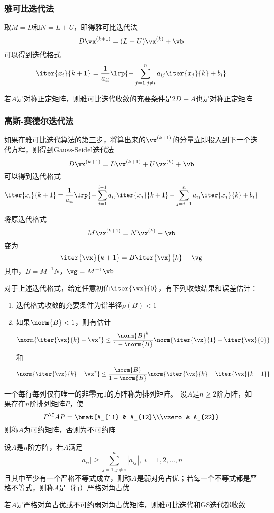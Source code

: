 \subsubsection{雅可比迭代法}
取$M=D$和$N=L+U$，即得雅可比迭代法
\[D\vx^{(k+1)}=(L+U)\vx^{(k)}+\vb\]
可以得到迭代格式
\[\iter{x_i}{k+1}=\frac{1}{a_{ii}}\lrp{-\sum_{j=1,j\ne i}^n a_{ij}\iter{x_j}{k}+b_i}\]

\begin{theorem}
    若$A$是对称正定矩阵，则雅可比迭代收敛的充要条件是$2D-A$也是对称正定矩阵
\end{theorem}

\subsubsection{高斯-赛德尔迭代法}
如果在雅可比迭代算法的第三步，将算出来的$\vx^{(k+1)}$的分量立即投入到下一个迭代方程，则得到Gauss-Seidel迭代法
\[D\vx^{(k+1)}=L\vx^{(k+1)}+U\vx^{(k)}+\vb\]
可以得到迭代格式
\[\iter{x_i}{k+1}=\frac{1}{a_{ii}}\lrp{-\sum_{j=1}^{i-1}a_{ij}\iter{x_j}{k+1}-\sum_{j=i+1}^na_{ij}\iter{x_j}{k}+b_i}\]

将原迭代格式
\[M\vx^{(k+1)}=N\vx^{(k)}+\vb\]
变为
\[\iter{\vx}{k+1}=B\iter{\vx}{k}+\vg\]
其中，$B=M^{-1}N$，$\vg=M^{-1}\vb$
\begin{theorem}
    对于上述迭代格式，给定任意初值$\iter{\vx}{0}$，有下列收敛结果和误差估计：
    \begin{enumerate}
        \item 迭代格式收敛的充要条件为谱半径$\rho(B)<1$
        \item 如果$\norm{B}<1$，则有估计
        \[\norm{\iter{\vx}{k}-\vx^\star}\leq\frac{\norm{B}^{k}}{1-\norm{B}}\norm{\iter{\vx}{1}-\iter{\vx}{0}}\]
        和
        \[\norm{\iter{\vx}{k}-\vx^\star}\leq\frac{\norm{B}}{1-\norm{B}}\norm{\iter{\vx}{k}-\iter{\vx}{k-1}}\]
    \end{enumerate}
\end{theorem}

\begin{definition}[不可约]
    一个每行每列仅有唯一的非零元$1$的方阵称为排列矩阵。
    设$A$是$n\geq 2$阶方阵，如果存在$n$阶排列矩阵$P$，使
    \[P^\T AP=\bmat{A_{11} & A_{12}\\\vzero & A_{22}}\]
    则称$A$为可约矩阵，否则为不可约阵
\end{definition}
\begin{definition}[对角占优]
    设$A$是$n$阶方阵，若$A$满足
    \[|a_{ii}|\geq \sum_{j=1,j\ne i}^n|a_{ij}|,\;i=1,2,\ldots,n\]
    且其中至少有一个严格不等式成立，则称$A$是弱对角占优；若每一个不等式都是严格不等式，则称$A$是（行）严格对角占优
\end{definition}
\begin{theorem}
    若$A$是严格对角占优或不可约弱对角占优矩阵，则雅可比迭代和GS迭代都收敛
\end{theorem}


